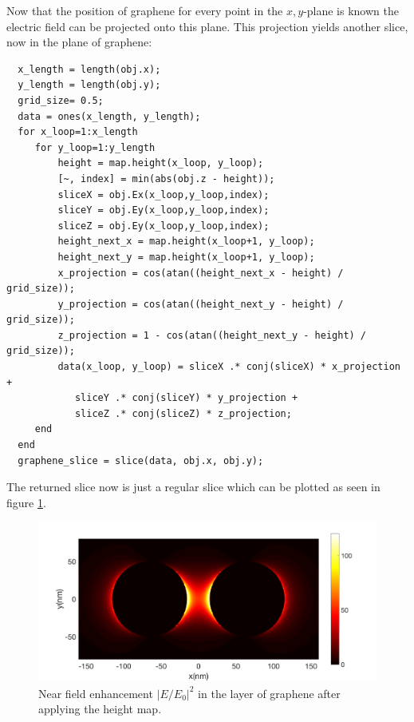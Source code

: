 Now that the position of graphene for every point in the $x,y$-plane is known the electric field can be projected onto this plane. This projection yields another slice, now in the plane of graphene:

\begin{verbatim}
  x_length = length(obj.x);
  y_length = length(obj.y);
  grid_size= 0.5;
  data = ones(x_length, y_length);
  for x_loop=1:x_length
     for y_loop=1:y_length
         height = map.height(x_loop, y_loop);
         [~, index] = min(abs(obj.z - height));
         sliceX = obj.Ex(x_loop,y_loop,index);
         sliceY = obj.Ey(x_loop,y_loop,index);
         sliceZ = obj.Ey(x_loop,y_loop,index);
         height_next_x = map.height(x_loop+1, y_loop);
         height_next_y = map.height(x_loop+1, y_loop);
         x_projection = cos(atan((height_next_x - height) / grid_size));
         y_projection = cos(atan((height_next_y - height) / grid_size));
         z_projection = 1 - cos(atan((height_next_y - height) / grid_size));
         data(x_loop, y_loop) = sliceX .* conj(sliceX) * x_projection +
            sliceY .* conj(sliceY) * y_projection +
            sliceZ .* conj(sliceZ) * z_projection;
     end
  end
  graphene_slice = slice(data, obj.x, obj.y);
\end{verbatim}

The returned slice now is just a regular slice which can be plotted as seen in figure \ref{fig:projected}.

\begin{figure}[!h]
  \centering
  \includegraphics[width=\textwidth]{./images/graphene-layer.png}
  \caption{Near field enhancement $|E/E_0|^2$ in the layer of graphene after applying the height map.}
  \label{fig:projected}
\end{figure}
